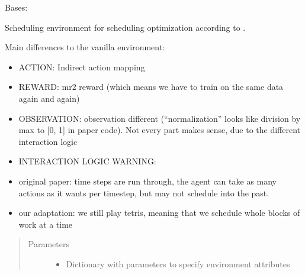 \documentclass[letterpaper,10pt,english]{sphinxmanual}
\begin{document}
\begin{fulllineitems}
\label{\detokenize{environments:environments.env_tetris_scheduling_indirect_action.IndirectActionEnv}}
\sphinxAtStartPar
Bases: 

\sphinxAtStartPar
Scheduling environment for scheduling optimization according to
.

\sphinxAtStartPar
Main differences to the vanilla environment:
\begin{itemize}
\item {} 
\sphinxAtStartPar
ACTION: Indirect action mapping

\item {} 
\sphinxAtStartPar
REWARD: m\sphinxhyphen{}r2 reward (which means we have to train on the same data again and again)

\item {} 
\sphinxAtStartPar
OBSERVATION: observation different (“normalization” looks like division by max to {[}0, 1{]} in paper code). Not every
part makes sense, due to the different interaction logic

\item {} 
\sphinxAtStartPar
INTERACTION LOGIC WARNING:

\item {} 
\sphinxAtStartPar
original paper: time steps are run through, the agent can take as many actions as it wants per time\sphinxhyphen{}step,
but may not schedule into the past.

\item {} 
\sphinxAtStartPar
our adaptation: we still play tetris, meaning that we schedule whole blocks of work at a time

\end{itemize}
\begin{quote}\begin{description}
\item[{Parameters}] \leavevmode\begin{itemize}
\item {} 
\sphinxAtStartPar
{} \textendash{} Dictionary with parameters to specify environment attributes


\end{itemize}
\end{description}
\end{quote}
\end{fulllineitems}
\end{document}
